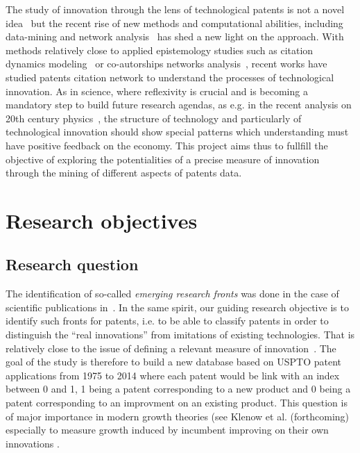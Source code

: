 

The study of innovation through the lens of technological patents is not a novel idea~\cite{basberg1987patents} but the recent rise of new methods and computational abilities, including data-mining and network analysis~\cite{newman2010networks} has shed a new light on the approach. With methods relatively close to applied epistemology studies such as citation dynamics modeling~\cite{2013arXiv1310.8220N} or co-autorships networks analysis~\cite{2014arXiv1402.7268S}, recent works have studied patents citation network to understand the processes of technological innovation. As in science, where reflexivity is crucial and is becoming a mandatory step to build future research agendas, as e.g. in the recent analysis on 20th century physics~\cite{Sinatra:2015yu}, the structure of technology and particularly of technological innovation should show special patterns which understanding must have positive feedback on the economy.
This project aims thus to fullfill the objective of exploring the potentialities of a precise measure of innovation through the mining of different aspects of patents data.





\section{Research objectives}


\subsection{Research question}

The identification of so-called \emph{emerging research fronts} was done in the case of scientific publications in~\cite{shibata2008detecting}. In the same spirit, our guiding research objective is to identify such fronts for patents, i.e. to be able to classify patents in order to distinguish the ``real innovations'' from imitations of existing technologies. That is relatively close to the issue of defining a relevant measure of innovation~\cite{archibugi1988search}. The goal of the study is therefore to build a new database based on USPTO patent applications from 1975 to 2014 where each patent would be link with an index between 0 and 1, 1 being a patent corresponding to a new product and 0 being a patent corresponding to an improvment on an existing product. This question is of major importance in modern growth theories (see Klenow et al. (forthcoming) especially to measure growth induced by incumbent improving on their own innovations \cite{KletteKortum2002}.




